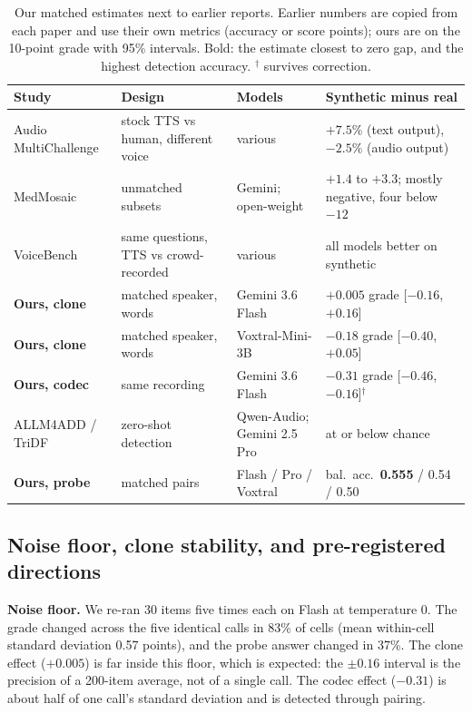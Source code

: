 \begin{table}[t]
\small
\centering
\begin{tabular}{>{\raggedright\arraybackslash}p{3.1cm}>{\raggedright\arraybackslash}p{2.6cm}>{\raggedright\arraybackslash}p{2.3cm}>{\raggedright\arraybackslash}p{4.2cm}}
\toprule
Study & Design & Models & Synthetic minus real \\
\midrule
Audio MultiChallenge \citep{a2512_14865} & stock TTS vs human, different voice & various & $+7.5\%$ (text output), $-2.5\%$ (audio output) \\
MedMosaic \citep{a2605_00969} & unmatched subsets & Gemini; open-weight & $+1.4$ to $+3.3$; mostly negative, four below $-12$ \\
VoiceBench \citep{a2410_17196} & same questions, TTS vs crowd-recorded & various & all models better on synthetic \\
\midrule
\textbf{Ours, clone} & matched speaker, words & Gemini 3.6 Flash & $\mathbf{+0.005}$ grade [$-0.16$, $+0.16$] \\
\textbf{Ours, clone} & matched speaker, words & Voxtral-Mini-3B & $-0.18$ grade [$-0.40$, $+0.05$] \\
\textbf{Ours, codec} & same recording & Gemini 3.6 Flash & $-0.31$ grade [$-0.46$, $-0.16$]$^\dagger$ \\
\midrule
ALLM4ADD / TriDF \citep{a2505_11079,a2512_10652} & zero-shot detection & Qwen-Audio; Gemini 2.5 Pro & at or below chance \\
\textbf{Ours, probe} & matched pairs & Flash / Pro / Voxtral & bal.\ acc.\ \textbf{0.555} / 0.54 / 0.50 \\
\bottomrule
\end{tabular}
\caption{Our matched estimates next to earlier reports. Earlier numbers are copied from each paper and use their own metrics (accuracy or score points); ours are on the 10-point grade with 95\% intervals. Bold: the estimate closest to zero gap, and the highest detection accuracy. $^\dagger$ survives correction.}
\label{tab:baselines}
\end{table}

\subsection{Noise floor, clone stability, and pre-registered directions}
\label{sec:results-batteries}

\textbf{Noise floor.} We re-ran 30 items five times each on Flash at temperature 0. The grade changed across the five identical calls in 83\% of cells (mean within-cell standard deviation 0.57 points), and the probe answer changed in 37\%. The clone effect ($+0.005$) is far inside this floor, which is expected: the $\pm 0.16$ interval is the precision of a 200-item average, not of a single call. The codec effect ($-0.31$) is about half of one call's standard deviation and is detected through pairing.

